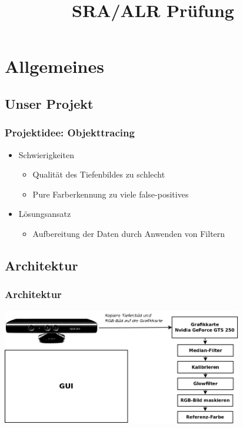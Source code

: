 \documentclass{beamer}
\title[]{SRA/ALR Prüfung\\ \ort}
\author{\autor}
\institute{Fakultät für Informatik\\
           Hochschule Mannheim\\}
\date{\datum}
\begin{document}
\begin{frame}
\titlepage
\end{frame}

\begin{frame}
  \tableofcontents                       %
\end{frame}

\section{Allgemeines}
\subsection{Unser Projekt}
\begin{frame}
\frametitle{Projektidee: Objekttracing}

\hspace*{0,3cm}{Jede einigermaßen ebene Fläche soll als Whiteboard dienen können.}

\vspace*{0,8cm}

\begin{itemize}
	\item Schwierigkeiten
	\begin{itemize}
		\item Qualität des Tiefenbildes zu schlecht
		\item Pure Farberkennung zu viele false-positives
	\end{itemize}
	\item Lösungsansatz
		\begin{itemize}
		\item Aufbereitung der Daten durch Anwenden von Filtern
	\end{itemize}
\end{itemize}
\end{frame}

\subsection{Architektur}

\begin{frame}
\frametitle{Architektur}
\hspace*{0.9cm}\includegraphics[width=10.5cm]{architektur.png}

\end{frame}
\end{document}
